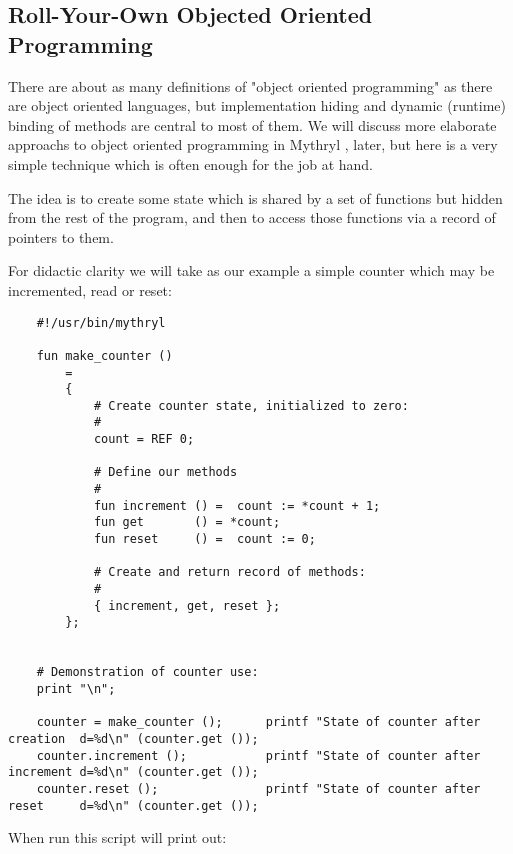 \cutend*


\subsection{Roll-Your-Own Objected Oriented Programming}
\label{section:tut:delving-deeper:roll-your-own-oop}

There are about as many definitions of "object oriented programming" as there 
are object oriented languages, but implementation hiding and dynamic (runtime) 
binding of methods are central to most of them.  We will discuss more elaborate 
approachs to object oriented programming in Mythryl 
, 
later, but here is a very simple technique which is often enough for the job at hand. 

The idea is to create some state which is shared by a set of functions but 
hidden from the rest of the program, and then to access those functions via 
a record of pointers to them.

For didactic clarity we will take as our example a simple counter which may 
be incremented, read or reset:

\begin{verbatim}
    #!/usr/bin/mythryl

    fun make_counter ()
        =
        {
            # Create counter state, initialized to zero:
            #
            count = REF 0;

            # Define our methods
            #
            fun increment () =  count := *count + 1;
            fun get       () = *count;
            fun reset     () =  count := 0;

            # Create and return record of methods:
            #
            { increment, get, reset };
        };


    # Demonstration of counter use:
    print "\n";

    counter = make_counter ();      printf "State of counter after creation  d=%d\n" (counter.get ());
    counter.increment ();           printf "State of counter after increment d=%d\n" (counter.get ());
    counter.reset ();               printf "State of counter after reset     d=%d\n" (counter.get ());
\end{verbatim}

When run this script will print out:

